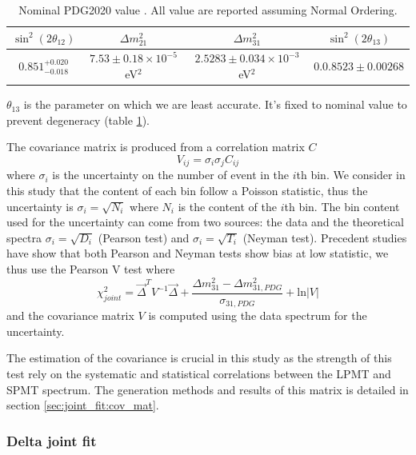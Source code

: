\documentclass[../main.tex]{subfiles}
\begin{document}
\begin{table}
  \centering
  \begin{tabular}{c|c|c|c}
    $\sin^2(2\theta_{12})$    & $\Delta m^2_{21}$                       & $\Delta m^2_{31}$      & $\sin^2(2\theta_{13})$ \\
    \hline
    $0.851^{+0.020}_{-0.018}$ & $7.53 \pm 0.18 \times 10^{-5}$ eV$^2$   & $2.5283 \pm 0.034 \times 10^{-3}$ eV$^2$  & $0.0.8523 \pm 0.00268$
  \end{tabular}
  \caption{Nominal PDG2020 value \cite{particle_data_group_review_2020}. All value are reported assuming Normal Ordering.}
  \label{tab:joint_fit:pdg_value}
\end{table}



$\theta_{13}$ is the parameter on which we are least accurate. It's fixed to nominal value to prevent degeneracy (table \ref{tab:joint_fit:pdg_value}).

The covariance matrix is produced from a correlation matrix $C$
\begin{equation}
  V_{ij} = \sigma_{i} \sigma_{j} C_{ij}
\end{equation}
where $\sigma_{i}$ is the uncertainty on the number of event in the $i$th bin. We consider in this study that the content of each bin follow a Poisson statistic, thus the uncertainty is $\sigma_i = \sqrt{N_i}$ where $N_i$ is the content of the $i$th bin. The bin content used for the uncertainty can come from two sources: the data and the theoretical spectra $\sigma_i = \sqrt{D_i}$ (Pearson test) and $\sigma_i = \sqrt{T_i}$ (Neyman test). Precedent studies have show that both Pearson and Neyman tests show bias at low statistic, we thus use the Pearson V test where
\begin{equation}
  \label{eq:joint_fit:pearsonV}
  \chi^2_{joint} = \vec{\Delta}^T V^{-1} \vec{\Delta} + \frac{\Delta m^2_{31} - \Delta m^2_{31,PDG}}{\sigma_{31, PDG}} + \mathrm{ln} | V |
\end{equation}
and the covariance matrix $V$ is computed using the data spectrum for the uncertainty.

The estimation of the covariance is crucial in this study as the strength of this test rely on the systematic and statistical correlations between the LPMT and SPMT spectrum. The generation methods and results of this matrix is detailed in section \ref{sec:joint_fit:cov_mat}.

\subsubsection{Delta joint fit}
\end{document}
